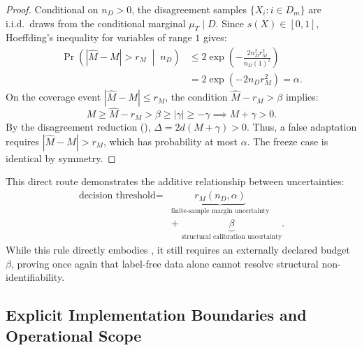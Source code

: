 \begin{proof}
Conditional on $n_D > 0$, the disagreement samples $\{X_i : i \in D_m\}$ are i.i.d.\ draws from the conditional
marginal $\mu_T \mid D$. Since $s(X) \in [0, 1]$, Hoeffding's inequality for variables of range $1$ gives:
\begin{align*}
 \Pr\left(|\widehat M - M| > r_M \;\middle|\; n_D\right)
 &\le 2\exp\left(-\frac{2n_D^2 r_M^2}{n_D(1)^2}\right) \\
 &= 2\exp\left(-2n_D r_M^2\right) = \alpha.
\end{align*}
On the coverage event $|\widehat M - M| \le r_M$, the condition $\widehat M - r_M > \beta$ implies:
\[
 M \ge \widehat M - r_M > \beta \ge |\gamma| \ge -\gamma \implies M + \gamma > 0.
\]
By the disagreement reduction (), $\Delta = 2d(M + \gamma) > 0$.
Thus, a false adaptation requires $|\widehat M - M| > r_M$, which has probability at most $\alpha$.
The freeze case is identical by symmetry.
\end{proof}

This direct route demonstrates the additive relationship between uncertainties:
\begin{align*}
 \text{decision threshold} ={} &\underbrace{r_M(n_D, \alpha)}_{\text{finite-sample margin uncertainty}} \\
 &+ \;\underbrace{\beta}_{\text{structural calibration uncertainty}}.
\end{align*}
While this rule directly embodies , it still requires an externally declared
budget $\beta$, proving once again that label-free data alone cannot resolve structural non-identifiability.

\subsection{Explicit Implementation Boundaries and Operational Scope}
\label{app:implementation-boundaries}

